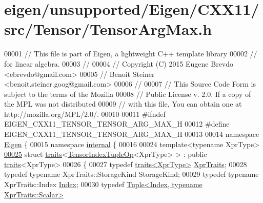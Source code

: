 \hypertarget{eigen_2unsupported_2_eigen_2_c_x_x11_2src_2_tensor_2_tensor_arg_max_8h_source}{}\section{eigen/unsupported/\+Eigen/\+C\+X\+X11/src/\+Tensor/\+Tensor\+Arg\+Max.h}
\label{eigen_2unsupported_2_eigen_2_c_x_x11_2src_2_tensor_2_tensor_arg_max_8h_source}

\begin{DoxyCode}
00001 \textcolor{comment}{// This file is part of Eigen, a lightweight C++ template library}
00002 \textcolor{comment}{// for linear algebra.}
00003 \textcolor{comment}{//}
00004 \textcolor{comment}{// Copyright (C) 2015 Eugene Brevdo <ebrevdo@gmail.com>}
00005 \textcolor{comment}{//                    Benoit Steiner <benoit.steiner.goog@gmail.com>}
00006 \textcolor{comment}{//}
00007 \textcolor{comment}{// This Source Code Form is subject to the terms of the Mozilla}
00008 \textcolor{comment}{// Public License v. 2.0. If a copy of the MPL was not distributed}
00009 \textcolor{comment}{// with this file, You can obtain one at http://mozilla.org/MPL/2.0/.}
00010 
00011 \textcolor{preprocessor}{#ifndef EIGEN\_CXX11\_TENSOR\_TENSOR\_ARG\_MAX\_H}
00012 \textcolor{preprocessor}{#define EIGEN\_CXX11\_TENSOR\_TENSOR\_ARG\_MAX\_H}
00013 
00014 \textcolor{keyword}{namespace }\hyperlink{namespace_eigen}{Eigen} \{
00015 \textcolor{keyword}{namespace }\hyperlink{namespaceinternal}{internal} \{
00016 
00024 \textcolor{keyword}{template}<\textcolor{keyword}{typename} XprType>
\hyperlink{struct_eigen_1_1internal_1_1traits_3_01_tensor_index_tuple_op_3_01_xpr_type_01_4_01_4}{00025} \textcolor{keyword}{struct }\hyperlink{struct_eigen_1_1internal_1_1traits}{traits}<\hyperlink{class_eigen_1_1_tensor_index_tuple_op}{TensorIndexTupleOp}<XprType> > : \textcolor{keyword}{public} 
      \hyperlink{struct_eigen_1_1internal_1_1traits}{traits}<XprType>
00026 \{
00027   \textcolor{keyword}{typedef} \hyperlink{struct_eigen_1_1internal_1_1traits}{traits<XprType>} \hyperlink{struct_eigen_1_1internal_1_1traits}{XprTraits};
00028   \textcolor{keyword}{typedef} \textcolor{keyword}{typename} XprTraits::StorageKind StorageKind;
00029   \textcolor{keyword}{typedef} \textcolor{keyword}{typename} XprTraits::Index \hyperlink{namespace_eigen_a62e77e0933482dafde8fe197d9a2cfde}{Index};
00030   \textcolor{keyword}{typedef} \hyperlink{struct_eigen_1_1_tuple}{Tuple<Index, typename XprTraits::Scalar>} 

\end{DoxyCode}
